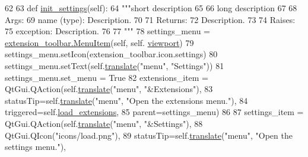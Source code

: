 \begin{DoxyCode}
62 
63     \textcolor{keyword}{def }\hyperlink{classcommotion__client_1_1GUI_1_1toolbar_1_1ToolBar_acb467ccaffdcd2c10fcce88a2d167079}{init\_settings}(self):
64         \textcolor{stringliteral}{"""short description}
65 \textcolor{stringliteral}{        }
66 \textcolor{stringliteral}{        long description}
67 \textcolor{stringliteral}{        }
68 \textcolor{stringliteral}{        Args:}
69 \textcolor{stringliteral}{        name (type): Description.}
70 \textcolor{stringliteral}{        }
71 \textcolor{stringliteral}{        Returns:}
72 \textcolor{stringliteral}{        Description.}
73 \textcolor{stringliteral}{        }
74 \textcolor{stringliteral}{        Raises:}
75 \textcolor{stringliteral}{        exception: Description.}
76 \textcolor{stringliteral}{        }
77 \textcolor{stringliteral}{        """}
78         settings\_menu = \hyperlink{classcommotion__client_1_1GUI_1_1extension__toolbar_1_1MenuItem}{extension\_toolbar.MenuItem}(self, self.
      \hyperlink{classcommotion__client_1_1GUI_1_1toolbar_1_1ToolBar_a34d12135499302eef49fbe526cd0d66b}{viewport})
79         settings\_menu.setIcon(extension\_toolbar.icon.settings)
80         settings\_menu.setText(self.\hyperlink{classcommotion__client_1_1GUI_1_1toolbar_1_1ToolBar_a5ec3c619935f7e0626f9cb608be8e27f}{translate}(\textcolor{stringliteral}{"menu"}, \textcolor{stringliteral}{"Settings"}))
81         settings\_menu.set\_menu = \textcolor{keyword}{True}
82         extensions\_item = QtGui.QAction(self.\hyperlink{classcommotion__client_1_1GUI_1_1toolbar_1_1ToolBar_a5ec3c619935f7e0626f9cb608be8e27f}{translate}(\textcolor{stringliteral}{"menu"}, \textcolor{stringliteral}{"&Extensions"}),
83                                         statusTip=self.\hyperlink{classcommotion__client_1_1GUI_1_1toolbar_1_1ToolBar_a5ec3c619935f7e0626f9cb608be8e27f}{translate}(\textcolor{stringliteral}{"menu"}, \textcolor{stringliteral}{"Open the extensions
       menu."}),
84                                         triggered=self.\hyperlink{classcommotion__client_1_1GUI_1_1toolbar_1_1ToolBar_a498f1b3352a8c1ee491921afb707fafa}{load\_extensions},
85                                         parent=settings\_menu)
86         
87         settings\_item = QtGui.QAction(self.\hyperlink{classcommotion__client_1_1GUI_1_1toolbar_1_1ToolBar_a5ec3c619935f7e0626f9cb608be8e27f}{translate}(\textcolor{stringliteral}{"menu"}, \textcolor{stringliteral}{"&Settings"}),
88                                       QtGui.QIcon(\textcolor{stringliteral}{"icons/load.png"}),
89                                       statusTip=self.\hyperlink{classcommotion__client_1_1GUI_1_1toolbar_1_1ToolBar_a5ec3c619935f7e0626f9cb608be8e27f}{translate}(\textcolor{stringliteral}{"menu"}, \textcolor{stringliteral}{"Open the settings menu."}),

\end{DoxyCode}
